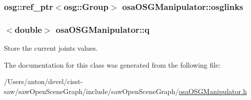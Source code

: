 \subsubsection[{osglinks}]{\setlength{\rightskip}{0pt plus 5cm}osg\+::ref\+\_\+ptr$<$osg\+::\+Group$>$ osa\+O\+S\+G\+Manipulator\+::osglinks\hspace{0.3cm}{\ttfamily [protected]}}\label{classosa_o_s_g_manipulator_ad1e42f7391b136a347497f9e6f9df761}
\hypertarget{classosa_o_s_g_manipulator_a834ce7263dace4d925133753522abaa3}{}
\subsubsection[{q}]{$<$double$>$ osa\+O\+S\+G\+Manipulator\+::q\hspace{0.3cm}{\ttfamily [protected]}}\label{classosa_o_s_g_manipulator_a834ce7263dace4d925133753522abaa3}


Store the current joints values. 



The documentation for this class was generated from the following file\+:\begin{DoxyCompactItemize}
\item 
/\+Users/anton/devel/cisst-\/saw/saw\+Open\+Scene\+Graph/include/saw\+Open\+Scene\+Graph/\hyperlink{osa_o_s_g_manipulator_8h}{osa\+O\+S\+G\+Manipulator.\+h}\end{DoxyCompactItemize}
